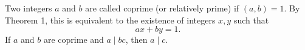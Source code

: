 Two integers $a$ and $b$ are called coprime (or relatively prime) if $(a, b) = 1$. By Theorem 1, this is equivalent to the existence of integers $x, y$ such that
$$ax + by = 1.$$
If $a$ and $b$ are coprime and $a \mid bc$, then $a \mid c$.
